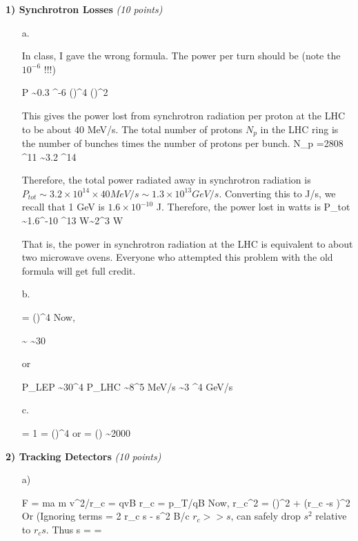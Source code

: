 {\large

\textbf{1) Synchrotron Losses } \hfill \textit{(10 points)}\\

\begin{itemize}
\item[a.]{ 
In class,  I gave the wrong formula.  The power per turn should be (note the \textbf{$10^{-6}$} !!!)

\be
P \sim 0.3 ^{-6} \left(\right)^4 \left(\right)^2
\ee

This gives the power lost from synchrotron radiation per proton at the LHC to be about 40 MeV/s. 
The total number of protons $N_p$ in the LHC ring is the number of bunches times the number of protons per bunch.
\be
N_p =2808  ^{11} \sim 3.2 ^{14}
\ee

Therefore, the total power radiated away in synchrotron radiation is $P_{tot} \sim 3.2 \times 10^{14} \times 40 MeV/s \sim 1.3\times 10^{13} GeV/s$.
Converting this to J/s, we recall that 1 GeV is $1.6 \times 10^{-10}$ J. Therefore, the power lost in watts is
\be
P_{tot} \sim 1.6^{-10} ^{13} W\sim 2^3 W
\ee

That is, the power in synchrotron radiation at the LHC is equivalent to about two microwave ovens.
Everyone who attempted this problem with the old formula will get full credit.

}
\item[b.]{
\be
{} = \left(\right)^4
\ee
Now, 

\be
{} \sim {} \sim 30
\ee

or 

\be
P_{LEP} \sim 30^4 P_{LHC} \sim 8^5  MeV/s \sim 3 ^4 GeV/s 
\ee

}
\item[c.]{
\be
{} = 1 = \left(\right)^4 
\ee
or 
\be
{}  = \left(\right) \sim 2000
\ee

}

\end{itemize}

\vspace*{0.25in}

\textbf{2) Tracking Detectors } \hfill \textit{(10 points)}\\
\begin{itemize}
\item[a)]{
\be
F = ma \Rightarrow m v^2/r_c = qvB  \Rightarrow r_c = p_T/qB
\ee
Now,
\be
r_c^2 = \left(\right)^2 + (r_c -s )^2
\ee
Or (Ignoring terms 
\be
{} = 2 r_c s - s^2
\ee
B/c $r_c >> s$, can safely drop $s^2$ relative to $r_c s$.  Thus
\be
s =  = 
\ee


}
\end{itemize}}
